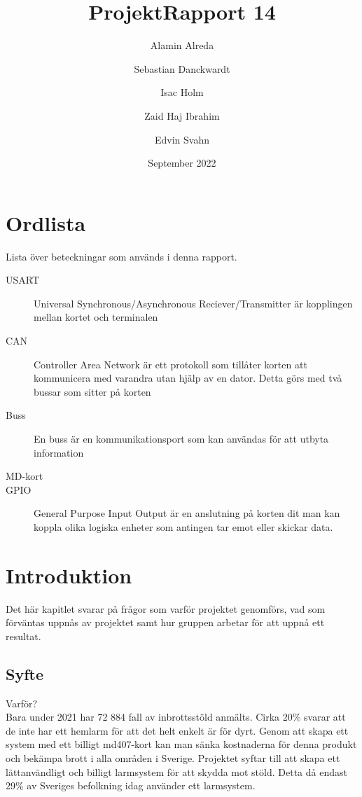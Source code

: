 \documentclass{article}
\title{ProjektRapport 14}
\author{Alamin Alreda \and Sebastian Danckwardt \and Isac Holm \and Zaid Haj Ibrahim   \and Edvin Svahn}
\date{September 2022}
\begin{document}
\maketitle

\section*{Ordlista}
Lista över beteckningar som används i denna rapport.
\begin{description}
    \item[USART] Universal Synchronous/Asynchronous Reciever/Transmitter är kopplingen mellan kortet och terminalen
    \item[CAN] Controller Area Network är ett protokoll som tillåter korten att kommunicera med varandra utan hjälp av en dator. Detta görs med två bussar som sitter på korten
    \item[Buss] En buss är en kommunikationsport som kan användas för att utbyta information
    \item[MD-kort]
    \item[GPIO] General Purpose Input Output är en anslutning på korten dit man kan koppla olika logiska enheter som antingen tar emot eller skickar data.
    
\end{description}
 
\section{Introduktion}
Det här kapitlet svarar på frågor som varför projektet genomförs,
vad som förväntas uppnås av projektet samt hur gruppen arbetar för att uppnå ett resultat.
\subsection{Syfte}
Varför?
\\
Bara under 2021 har 72 884 fall av inbrottsstöld anmälts\cite{BRa}. 
Cirka 20\% svarar att de inte har ett hemlarm för att det helt enkelt är för dyrt\cite{MoFor}.
Genom att skapa ett system med ett billigt md407-kort kan man sänka kostnaderna för denna produkt och bekämpa brott i alla områden i Sverige. 
Projektet syftar till att skapa ett lättanvändligt och billigt larmsystem för att skydda mot stöld. 
Detta då endast 29\% av Sveriges befolkning idag använder ett larmsystem\cite{SSF}.
\end{document}
